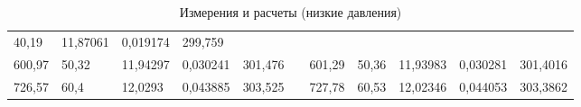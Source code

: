 \documentclass[12pt,a4paper]{article}
\begin{document}
\begin{enumerate}
{\begin{table}[p]
{\begin{tabular}{lllllllllll}
							\multicolumn{1}{l|}{40,19} &
							\multicolumn{1}{l|}{11,87061} &
							\multicolumn{1}{l|}{0,019174} &
							\multicolumn{1}{l|}{299,759} \\ \cline{1-5} \cline{7-11} 
							\multicolumn{1}{|l|}{600,97} &
							\multicolumn{1}{l|}{50,32} &
							\multicolumn{1}{l|}{11,94297} &
							\multicolumn{1}{l|}{0,030241} &
							\multicolumn{1}{l|}{301,476} &
							\multicolumn{1}{l|}{} &
							\multicolumn{1}{l|}{601,29} &
							\multicolumn{1}{l|}{50,36} &
							\multicolumn{1}{l|}{11,93983} &
							\multicolumn{1}{l|}{0,030281} &
							\multicolumn{1}{l|}{301,4016} \\ \cline{1-5} \cline{7-11} 
							\multicolumn{1}{|l|}{726,57} &
							\multicolumn{1}{l|}{60,4} &
							\multicolumn{1}{l|}{12,0293} &
							\multicolumn{1}{l|}{0,043885} &
							\multicolumn{1}{l|}{303,525} &
							\multicolumn{1}{l|}{} &
							\multicolumn{1}{l|}{727,78} &
							\multicolumn{1}{l|}{60,53} &
							\multicolumn{1}{l|}{12,02346} &
							\multicolumn{1}{l|}{0,044053} &
							\multicolumn{1}{l|}{303,3862} \\ \cline{1-5} \cline{7-11} 
						\end{tabular}%
					}
					\caption{Измерения и расчеты (низкие давления)}
					\label{tab:my-table}
				\end{table}
				
}
\end{enumerate}
\end{document}
